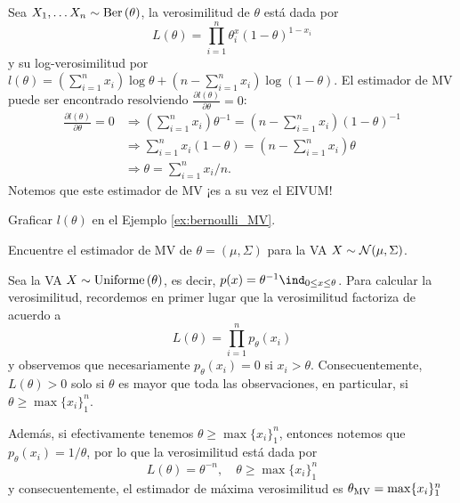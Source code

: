 \begin{example}
	\label{ex:bernoulli_MV}
	Sea $X_1,\ldots X_n\sim\text{Ber}\left(\theta\right)$, la verosimilitud de $\theta$ está dada por 
	\begin{equation}
		L(\theta) = \prod_{i=1}^n\theta^x_i(1-\theta)^{1-x_i}
	\end{equation}
	y su log-verosimilitud por $l(\theta) = (\sum_{i=1}^nx_i)\log \theta + (n-\sum_{i=1}^nx_i)\log(1-\theta)$. El estimador de  MV puede ser encontrado resolviendo $\frac{\partial l(\theta)}{\partial \theta} = 0$:
	\begin{align*}
	\frac{\partial l(\theta)}{\partial \theta} =0 
	&\Rightarrow  (\sum_{i=1}^nx_i) \theta^{-1} = (n-\sum_{i=1}^nx_i)(1-\theta)^{-1}\\
	&\Rightarrow  \sum_{i=1}^nx_i (1-\theta) = (n-\sum_{i=1}^nx_i) \theta\\
	&\Rightarrow  \theta = \sum_{i=1}^nx_i/n.
	\end{align*}
Notemos que este estimador de MV ¡es a su vez el EIVUM!	
\end{example}


\begin{exercise}
	Graficar $l(\theta)$ en el Ejemplo \ref{ex:bernoulli_MV}.
\end{exercise}

\begin{exercise}
	Encuentre el estimador de MV de $\theta = (\mu,\Sigma)$ para la VA $X\sim{\mathcal N}(\mu,\Sigma)$.
\end{exercise}

\begin{example}
	Sea la VA $X\sim\text{Uniforme}\left(\theta\right)$, es decir, $p(x) = \theta^{-1} \ind_{0\leq x \leq \theta}$. Para calcular la verosimilitud, recordemos en primer lugar que la verosimilitud factoriza de acuerdo a  
	\begin{equation}
		L(\theta) = \prod_{i=1}^n p_\theta(x_i)
	\end{equation}
	y observemos que necesariamente $p_\theta(x_i) = 0$ si $x_i>\theta$. Consecuentemente, $L(\theta)>0$ solo si $\theta$ es mayor que toda las observaciones, en particular, si $\theta\geq\max\{x_i\}_1^n$.

	Además, si efectivamente tenemos $\theta\geq\max\{x_i\}_1^n$, entonces notemos que $p_\theta(x_i) = 1/\theta$, por lo que la verosimilitud está dada por
		\begin{equation}
		L(\theta) = \theta^{-n}, \quad \theta\geq\max\{x_i\}_1^n
	\end{equation}
	y consecuentemente, el estimador de máxima verosimilitud es ${\theta_\text{MV}} = \max\{x_i\}_1^n$
\end{example}

